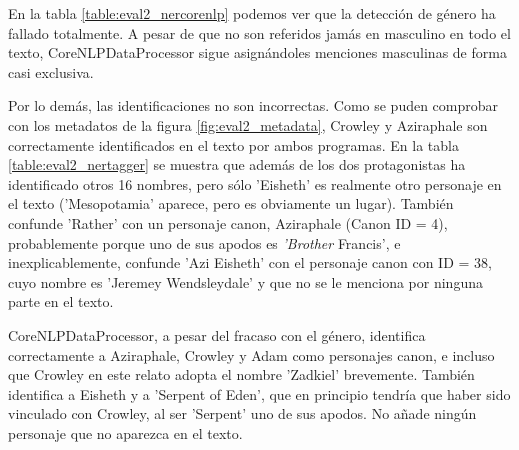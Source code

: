 \documentclass{pre-tfg}
\begin{document}
En la tabla \ref{table:eval2_nercorenlp} podemos ver que la detección de género ha fallado totalmente. A pesar de que no son referidos jamás en masculino en todo el texto, CoreNLPDataProcessor sigue asignándoles menciones masculinas de forma casi exclusiva.

Por lo demás, las identificaciones no son incorrectas. Como se puden comprobar con los metadatos de la figura \ref{fig:eval2_metadata}, Crowley y Aziraphale son correctamente identificados en el texto por ambos programas. En la tabla \ref{table:eval2_nertagger} se muestra que además de los dos protagonistas ha identificado otros 16 nombres, pero sólo 'Eisheth' es realmente otro personaje en el texto ('Mesopotamia' aparece, pero es obviamente un lugar). También confunde 'Rather' con un personaje canon, Aziraphale (Canon ID = 4), probablemente porque uno de sus apodos es \textit{'Brother} Francis', e inexplicablemente, confunde 'Azi Eisheth' con el personaje canon con ID = 38, cuyo nombre es 'Jeremey Wendsleydale' y que no se le menciona por ninguna parte en el texto.

CoreNLPDataProcessor, a pesar del fracaso con el género, identifica correctamente a Aziraphale, Crowley y Adam como personajes canon, e incluso que Crowley en este relato adopta el nombre 'Zadkiel' brevemente. También identifica a Eisheth y a 'Serpent of Eden', que en principio tendría que haber sido vinculado con Crowley, al ser 'Serpent' uno de sus apodos. No añade ningún personaje que no aparezca en el texto.
\end{document}
